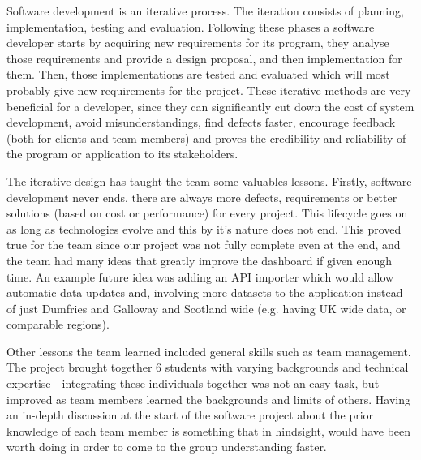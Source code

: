\documentclass{l3proj}
\begin{document}
Software development is an iterative process. The iteration consists of planning, implementation, testing and evaluation. Following these phases a software developer starts by acquiring new requirements for its program, they analyse those requirements and provide a design proposal, and then implementation for them. Then, those implementations are tested and evaluated which will most probably give new requirements for the project. These iterative methods are very beneficial for a developer, since they can significantly cut down the cost of system development, avoid misunderstandings, find defects faster, encourage feedback (both for clients and team members) and proves the credibility and reliability of the program or application to its stakeholders.

The iterative design has taught the team some valuables lessons. Firstly, software development never ends, there are always more defects, requirements or better solutions (based on cost or performance) for every project. This lifecycle goes on as long as technologies evolve and this by it's nature does not end. This proved true for the team since our project was not fully complete even at the end, and the team had many ideas that greatly improve the dashboard if given enough time. An example future idea was adding an API importer which would allow automatic data updates and, involving more datasets to the application instead of just Dumfries and Galloway and Scotland wide (e.g. having UK wide data, or comparable regions).

Other lessons the team learned included general skills such as team management. The project brought together 6 students with varying backgrounds and technical expertise - integrating these individuals together was not an easy task, but improved as team members learned the backgrounds and limits of others. Having an in-depth discussion at the start of the software project about the prior knowledge of each team member is something that in hindsight, would have been worth doing in order to come to the group understanding faster.



\end{document}
